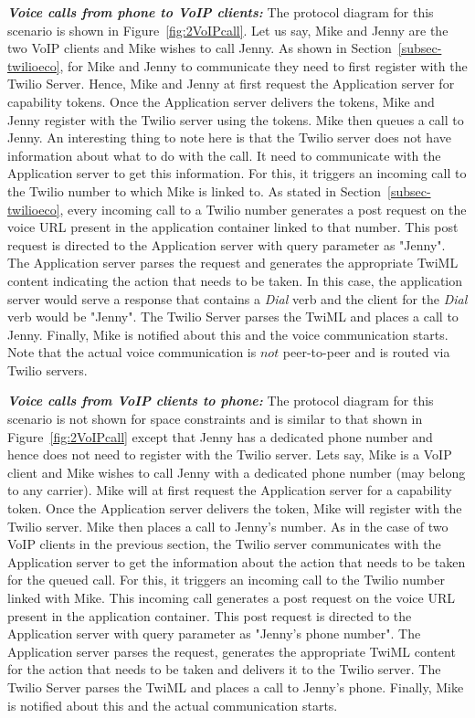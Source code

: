 \emph{\textbf{Voice calls from phone to VoIP clients:} }
The protocol diagram for this scenario is shown in Figure~\ref{fig:2VoIPcall}. Let us say, Mike and Jenny are the two VoIP clients and Mike wishes to call Jenny. As shown in Section~\ref{subsec-twilioeco}, for Mike and Jenny to communicate they need to first register with the Twilio Server. Hence, Mike and Jenny at first request the Application server for capability tokens. Once the Application server delivers the tokens, Mike and Jenny register with the Twilio server using the tokens. Mike then queues a call to Jenny. An interesting thing to note here is that the Twilio server does not have information about what to do with the call. It need to communicate with the Application server to get this information. For this, it triggers an incoming call to the Twilio number to which Mike is linked to. As stated in Section~\ref{subsec-twilioeco}, every incoming call to a Twilio number generates a post request on the voice URL present in the application container linked to that number. This post request is directed to the Application server with query parameter as "Jenny". The Application server parses the request and generates the appropriate TwiML content indicating the action that needs to be taken. In this case, the application server would serve a response that contains a \textit{Dial} verb and the client for the \textit{Dial} verb would be "Jenny". The Twilio Server parses the TwiML and places a call to Jenny. Finally, Mike is notified about this and the voice communication starts. Note that the actual voice communication is $not$ peer-to-peer and is routed via Twilio servers.  

\emph{\textbf{Voice calls from VoIP clients to phone:} }
The protocol diagram for this scenario is not shown for space constraints and is similar to that shown in Figure~\ref{fig:2VoIPcall} except that Jenny has a dedicated phone number and hence does not need to register with the Twilio server. Lets say, Mike is a VoIP client and Mike wishes to call Jenny with a dedicated phone number (may belong to any carrier). Mike will at first request the Application server for a capability token. Once the Application server delivers the token, Mike will register with the Twilio server. Mike then places a call to Jenny's number. As in the case of two VoIP clients in the previous section, the Twilio server communicates with the Application server to get the information about the action that needs to be taken for the queued call. For this, it triggers an incoming call to the Twilio number linked with Mike. This incoming call generates a post request on the voice URL present in the application container. This post request is directed to the Application server with query parameter as "Jenny's phone number". The Application server parses the request, generates the appropriate TwiML content for the action that needs to be taken and delivers it to the Twilio server. The Twilio Server parses the TwiML and places a call to Jenny's phone. Finally, Mike is notified about this and the actual communication starts. 


